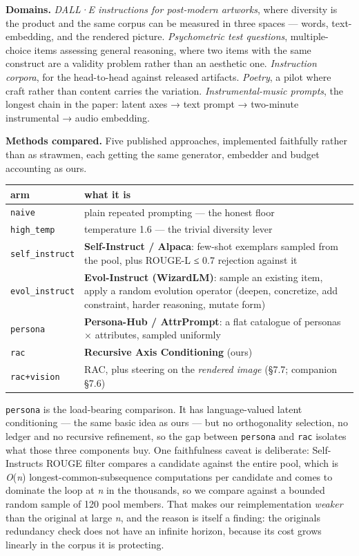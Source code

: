 \documentclass[
  10pt,
]{article}
\theoremstyle{plain}
\theoremstyle{definition}
\begin{document}
\textbf{Domains.} \emph{DALL·E instructions for post-modern artworks},
where diversity is the product and the same corpus can be measured in
three spaces --- words, text-embedding, and the rendered picture.
\emph{Psychometric test questions}, multiple-choice items assessing
general reasoning, where two items with the same construct are a
validity problem rather than an aesthetic one. \emph{Instruction
corpora}, for the head-to-head against released artifacts.
\emph{Poetry}, a pilot where craft rather than content carries the
variation. \emph{Instrumental-music prompts}, the longest chain in the
paper: latent axes → text prompt → two-minute instrumental → audio
embedding.

\textbf{Methods compared.} Five published approaches, implemented
faithfully rather than as strawmen, each getting the same generator,
embedder and budget accounting as ours.

{\footnotesize
\begin{longtable}[]{@{}>{\raggedright\arraybackslash}p{}>{\raggedright\arraybackslash}p{}@{}}
\toprule\noalign{}
arm & what it is \\
\midrule\noalign{}
\endhead
\bottomrule\noalign{}
\endlastfoot
\texttt{naive} & plain repeated prompting --- the honest floor \\
\texttt{high\_temp} & temperature 1.6 --- the trivial diversity lever \\
\texttt{self\_instruct} & \textbf{Self-Instruct / Alpaca}: few-shot
exemplars sampled from the pool, plus ROUGE-L ≤ 0.7 rejection against
it \\
\texttt{evol\_instruct} & \textbf{Evol-Instruct (WizardLM)}: sample an
existing item, apply a random evolution operator (deepen, concretize,
add constraint, harder reasoning, mutate form) \\
\texttt{persona} & \textbf{Persona-Hub / AttrPrompt}: a flat catalogue
of personas × attributes, sampled uniformly \\
\texttt{rac} & \textbf{Recursive Axis Conditioning} (ours) \\
\texttt{rac+vision} & RAC, plus steering on the \emph{rendered image}
(§7.7; companion §7.6) \\
\end{longtable}}

\texttt{persona} is the load-bearing comparison. It has language-valued
latent conditioning --- the same basic idea as ours --- but no
orthogonality selection, no ledger and no recursive refinement, so the
gap between \texttt{persona} and \texttt{rac} isolates what those three
components buy. One faithfulness caveat is deliberate:
Self-Instruct\textquotesingle s ROUGE filter compares a candidate
against the entire pool, which is \emph{O}(\emph{n})
longest-common-subsequence computations per candidate and comes to
dominate the loop at \emph{n} in the thousands, so we compare against a
bounded random sample of 120 pool members. That makes our
reimplementation \emph{weaker} than the original at large \emph{n}, and
the reason is itself a finding: the original\textquotesingle s
redundancy check does not have an infinite horizon, because its cost
grows linearly in the corpus it is protecting.
\end{document}
